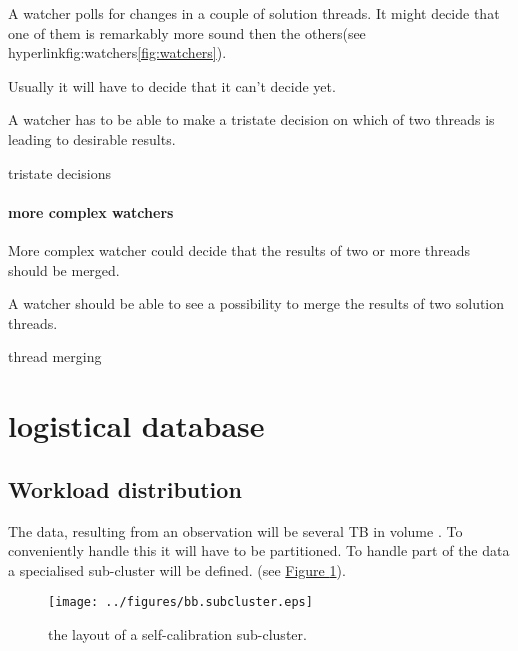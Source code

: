 \documentclass[]{lofar}
\begin{document}
          A watcher polls for changes in a couple of solution
          threads. It might decide that one of them is remarkably more
          sound then the others(see
          hyperlink{fig:watchers}{\ref{fig:watchers}}).

          Usually it will have to decide that it can't decide yet.

          \begin{requirement}
            A watcher has to be able to make a tristate decision on
            which of two threads is leading to desirable results.
            \caption{tristate decisions\label{req:no-decision}}
          \end{requirement}

        \paragraph{more complex watchers}
        \label{par:complex-watchers}\hypertarget{par:complex-watchers}{}

          More complex watcher could decide that the results of two or
          more threads should be merged.

          \begin{requirement}
            A watcher should be able to see a possibility to merge the
            results of two solution threads.
            \caption{thread merging\label{req:merge}}
          \end{requirement}

  \section{logistical database}
  \label{sec:logistical-datamodel}
  \hypertarget{sec:logistical-datamodel}{}

    \subsection{Workload distribution}
    \label{subsec:workload-distribution-2}\hypertarget{subsec:workload-distribution-2}{}

      The data, resulting from an observation will be several TB in
      volume
      \cite{bib:LOFAR-ASTRON-MEM-035}. To
      conveniently handle this it will have to be partitioned. To
      handle part of the data a specialised sub-cluster will be
      defined. (see \hyperlink{fig:bb.subcluster}{Figure \ref{fig:bb.subcluster}}).

      \begin{figure}
        \texttt{[image: ../figures/bb.subcluster.eps]}
        \hypertarget{fig:bb.subcluster}{}
        \caption{the layout of a self-calibration sub-cluster.\label{fig:bb.subcluster}}
      \end{figure}
\end{document}
